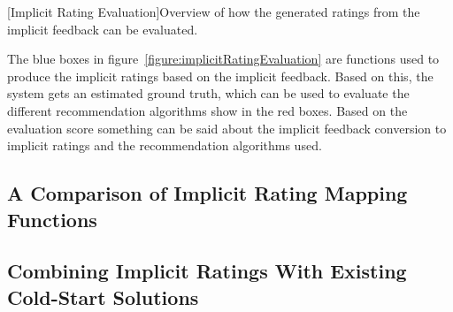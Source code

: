 \begin{center}
    [Implicit Rating Evaluation]{Overview of how the generated ratings from the implicit feedback can be evaluated.}
  	\label{figure:implicitRatingEvaluation}
  \end{center}

	The blue boxes in figure~\ref{figure:implicitRatingEvaluation} are functions used to produce the implicit ratings based on the implicit feedback.
	Based on this, the system gets an estimated ground truth, which can be used to evaluate the different recommendation algorithms show in the red boxes.
	Based on the evaluation score something can be said about the implicit feedback conversion to implicit ratings and the recommendation algorithms used.

\subsection{A Comparison of Implicit Rating Mapping Functions}
\subsection{Combining Implicit Ratings With Existing Cold-Start Solutions}
